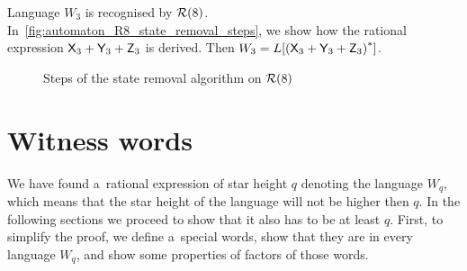 \begin{example}
    Language $W_3$ is recognised by ${\mathcal{R}}(8)$. In~\autoref*{fig:automaton_R8_state_removal_steps}, we show how the rational expression ${\mathsf{X}}_3 + {\mathsf{Y}}_3 + {\mathsf{Z}}_3$ is derived. Then $W_3 = L[{({\mathsf{X}}_3 + {\mathsf{Y}}_3 + {\mathsf{Z}}_3)}^*]$.

    \begin{figure}[h]%
        \centerline{
            \hspace{-15mm}%
            \qquad
            \qquad
            \subfloat[]{%
                }
        }
        \vspace{5mm}
        \centerline{
            \hspace{-15mm}%
            \subfloat[]{%
                }%
            \quad
            \subfloat[]{%
                }
            \quad
        }
        \vspace{5mm}
        \centerline{
            \hspace{-15mm}%
            \subfloat[]{%
                }%
            \quad
            \quad
            \subfloat[]{%
                }
        }
        \caption{Steps of the state removal algorithm on ${\mathcal{R}}(8)$}\label{fig:automaton_R8_state_removal_steps}%
    \end{figure}
\end{example}

\newpage\openright

\section{Witness words}\label{section:witness_words}

We have found a~rational expression of star height $q$ denoting the language $W_q$, which means that the star height of the language will not be higher then $q$. In the following sections we proceed to show that it also has to be at least $q$. First, to simplify the proof, we define a~special words, show that they are in every language $W_q$, and show some properties of factors of those words.

